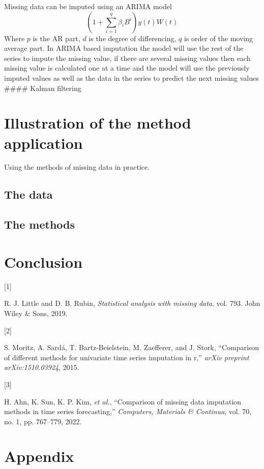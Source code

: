 \documentclass[
]{report}
\newlength{\cslhangindent}
\newlength{\csllabelwidth}
\newenvironment{CSLReferences}[2] %
 {\begin{list}{}{%
  \setlength{\itemindent}{0pt}
  \setlength{\leftmargin}{0pt}
  \setlength{\parsep}{0pt}
  \ifodd #1
   \setlength{\leftmargin}{\cslhangindent}
   \setlength{\itemindent}{-1\cslhangindent}
  \fi
  \setlength{\itemsep}{#2\baselineskip}}}
 {\end{list}}
\newcommand{\CSLLeftMargin}[1]{\parbox[t]{\csllabelwidth}{\strut#1\strut}}
\newcommand{\CSLRightInline}[1]{\parbox[t]{\linewidth - \csllabelwidth}{\strut#1\strut}}
\begin{document}
Missing data can be imputed using an ARIMA model
\[\left(1+ \sum_{i=1}^q \beta_i B^i\right)y(t)W(t)\] Where \(p\) is the
AR part, \(d\) is the degree of differencing, \(q\) is order of the
moving average part. In ARIMA based imputation the model will use the
rest of the series to impute the missing value, if there are several
missing values then each missing value is calculated one at a time and
the model will use the previously imputed values as well as the data in
the series to predict the next missing values \#\#\#\# Kalman filtering

\chapter{Illustration of the method
application}\label{illustration-of-the-method-application}

Using the methods of missing data in practice.

\section{The data}\label{the-data}

\section{The methods}\label{the-methods}

\chapter{Conclusion}\label{conclusion}

\label{refs}
\begin{CSLReferences}{0}{0}
\CSLLeftMargin{{[}1{]} }%
\CSLRightInline{R. J. Little and D. B. Rubin, \emph{Statistical analysis
with missing data}, vol. 793. John Wiley \& Sons, 2019.}

\CSLLeftMargin{{[}2{]} }%
\CSLRightInline{S. Moritz, A. Sardá, T. Bartz-Beielstein, M. Zaefferer,
and J. Stork, {``Comparison of different methods for univariate time
series imputation in r,''} \emph{arXiv preprint arXiv:1510.03924},
2015.}

\CSLLeftMargin{{[}3{]} }%
\CSLRightInline{H. Ahn, K. Sun, K. P. Kim, \emph{et al.}, {``Comparison
of missing data imputation methods in time series forecasting,''}
\emph{Computers, Materials \& Continua}, vol. 70, no. 1, pp. 767--779,
2022.}

\end{CSLReferences}

\chapter{Appendix}\label{appendix}
\end{document}
